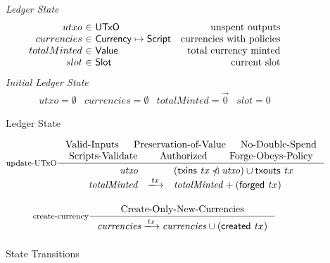 \documentclass[11pt,a4paper]{article}
\newcommand{\restrictdom}{\lhd}
\newcommand{\subtractdom}{\mathbin{\slashed{\restrictdom}}}
\newcommand{\union}{\cup}
\newcommand{\var}[1]{\mathit{#1}}
\newcommand{\fun}[1]{\mathsf{#1}}
\newcommand{\type}[1]{\mathsf{#1}}
\newcommand{\trans}[2]{\xlongrightarrow[\textsc{#1}]{#2}}
\newcommand{\Slot}{\type{Slot}}
\newcommand{\Script}{\type{Script}}
\newcommand{\Currency}{\type{Currency}}
\newcommand{\Value}{\type{Value}}
\newcommand{\UTxO}{\type{UTxO}}
\newcommand{\txins}[1]{\fun{txins}\ \var{#1}}
\newcommand{\txouts}[1]{\fun{txouts}\ \var{#1}}
\newcommand{\forged}[1]{\fun{forged}\ \var{#1}}
\newcommand{\created}[1]{\fun{created}\ \var{#1}}
\begin{document}
\begin{figure}

\emph{Ledger State}
%
\begin{equation*}
\begin{array}{r@{~\in~}lr}
utxo & \UTxO & \text{unspent outputs}
\\
currencies & \Currency \mapsto \Script
  & \text{currencies with policies}
\\
totalMinted & \Value & \text{total currency minted}
\\
slot & \Slot & \text{current slot}

\end{array}
\end{equation*}
\emph{Initial Ledger State}
%
\begin{equation*}
\begin{array}{llllll}
utxo = \emptyset
  & currencies = \emptyset
  & totalMinted = \vec{0}
  & slot = 0
\end{array}
\end{equation*}

\caption{Ledger State}
\label{fig:ledger_state}
\end{figure}

\begin{figure}
  \centering
  \begin{equation}\label{eq:utxo-update}
    \inference[update-UTxO]
    {
      \text{Valid-Inputs} & \text{Preservation-of-Value} & \text{No-Double-Spend} \\
      \text{Scripts-Validate} & \text{Authorized} & \text{Forge-Obeys-Policy}
    }
    {
      \begin{array}{rcl}
        \var{utxo} & & (\txins tx \subtractdom \var{utxo}) \union \txouts tx \\
        \var{totalMinted} & \trans{}{tx} & \var{totalMinted} + (\forged tx)\\
      \end{array}
    }
  \end{equation}

  \begin{equation}\label{eq:create-currency}
    \inference[create-currency]
    {
      \text{Create-Only-New-Currencies}
    }
    {
      \var{currencies} \trans{}{tx} \var{currencies} \union (\created tx)
    }
  \end{equation}

  \caption{State Transitions}
  \label{fig:state_transition}
\end{figure}
\end{document}
